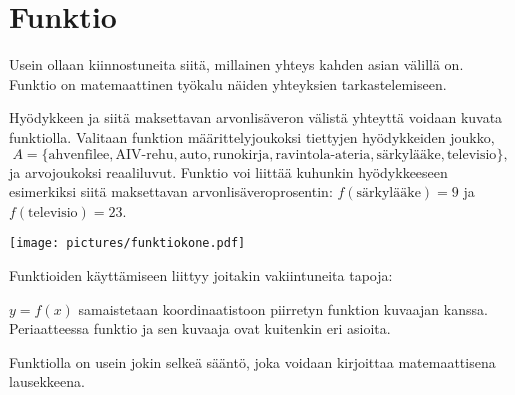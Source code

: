 \section{Funktio}

Usein ollaan kiinnostuneita siitä, millainen yhteys kahden asian välillä
on. Funktio on matemaattinen työkalu näiden yhteyksien tarkastelemiseen.


\begin{esimerkki}
Hyödykkeen ja siitä maksettavan arvonlisäveron välistä yhteyttä
voidaan kuvata funktiolla. Valitaan funktion määrittelyjoukoksi
tiettyjen hyödykkeiden joukko,
\[
A = \{\text{ahvenfilee}, \text{AIV-rehu}, \text{auto}, \text{runokirja}, \text{ravintola-ateria}, \text{särkylääke}, \text{televisio}\},
\]
ja arvojoukoksi reaaliluvut. Funktio voi liittää kuhunkin hyödykkeeseen
esimerkiksi siitä maksettavan arvonlisäveroprosentin:
$f(\text{särkylääke}) = 9$ ja $f(\text{televisio}) = 23$.

\begin{center}
\texttt{[image: pictures/funktiokone.pdf]}
\end{center}
\end{esimerkki}

Funktioiden käyttämiseen liittyy joitakin vakiintuneita tapoja:
\begin{alakohdat}
$y = f(x)$ samaistetaan koordinaatistoon piirretyn funktion kuvaajan kanssa.
Periaatteessa funktio ja sen kuvaaja ovat kuitenkin eri asioita.
\end{alakohdat}

Funktiolla on usein jokin selkeä sääntö, joka voidaan kirjoittaa
matemaattisena lausekkeena.

